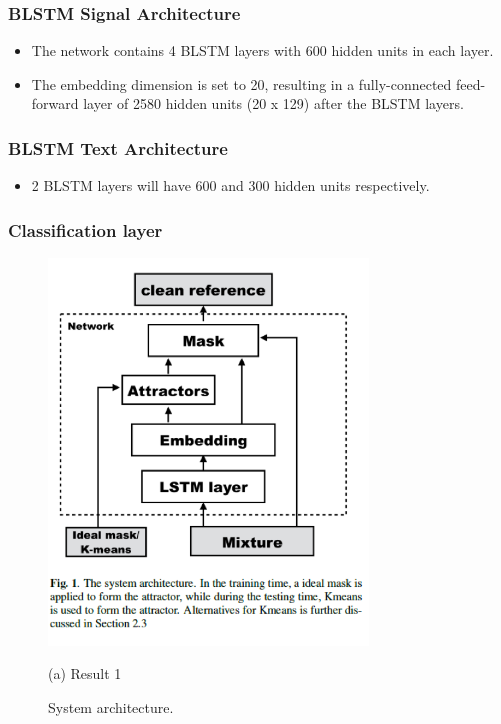 \documentclass{article}
\begin{document}
\subsubsection{BLSTM  Signal Architecture}
\begin{itemize}
\item The network contains 4  BLSTM layers with 600 hidden units in each layer.
\item The embedding dimension is set to 20, resulting in a fully-connected feed-forward layer of 2580 hidden units (20 x 129) after the BLSTM layers.
\end{itemize}

\subsubsection{BLSTM  Text Architecture}
\begin{itemize}
\item  2 BLSTM layers will have 600 and 300 hidden units respectively.
\end{itemize}
\label{sec:format}

\subsubsection{Classification layer}


\begin{figure}[htb]
\begin{minipage}[b]{1.0\linewidth}
  \centering
  \centerline{\includegraphics[width=8.5cm]{Picture1.png}}
  \centerline{(a) Result 1}\medskip
\end{minipage}
%
\caption{System architecture.}
\label{fig:res}
%
\end{figure}
\end{document}
